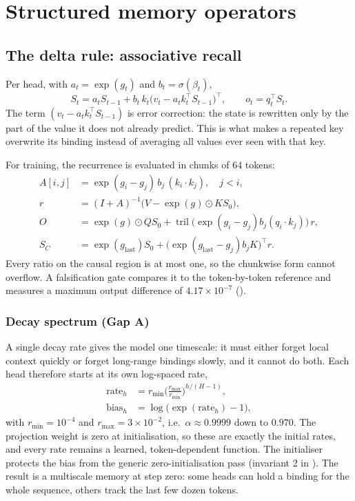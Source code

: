 \section{Structured memory operators}
\label{sec:memory}

\subsection{The delta rule: associative recall}
\label{sec:delta}

Per head, with $a_t=\exp(g_t)$ and $b_t=\sigma(\beta_t)$,
\begin{equation}
\label{eq:delta-seq}
S_t=a_t S_{t-1}+b_t\,k_t\big(v_t-a_t k_t^\top S_{t-1}\big)^\top,
\qquad o_t=q_t^\top S_t .
\end{equation}
The term $(v_t-a_t k_t^\top S_{t-1})$ is error correction: the state is rewritten only by the
part of the value it does not already predict. This is what makes a repeated key overwrite its
binding instead of averaging all values ever seen with that key.

For training, the recurrence is evaluated in chunks of 64 tokens:
\begin{align}
A[i,j]&=\exp(g_i-g_j)\,b_j\,(k_i\!\cdot\!k_j), \quad j<i,\\
r&=(I+A)^{-1}\big(V-\exp(g)\odot K S_0\big),\\
O&=\exp(g)\odot Q S_0+\operatorname{tril}\!\big(\exp(g_i-g_j)b_j(q_i\!\cdot\!k_j)\big)\,r,\\
S_C&=\exp(g_{\mathrm{last}})S_0+\big(\exp(g_{\mathrm{last}}-g_j)b_jK\big)^\top r .
\end{align}
Every ratio on the causal region is at most one, so the chunkwise form cannot overflow. A
falsification gate compares it to the token-by-token reference and measures a maximum output
difference of $4.17\times10^{-7}$ ().

\subsubsection{Decay spectrum (Gap A)}
\label{sec:gap-a-method}
A single decay rate gives the model one timescale: it must either forget local context quickly
or forget long-range bindings slowly, and it cannot do both. Each head therefore starts at its
own log-spaced rate,
\begin{equation}
\label{eq:spectrum}
\begin{aligned}
\mathrm{rate}_h&=r_{\min}\Big(\frac{r_{\max}}{r_{\min}}\Big)^{h/(H-1)},\\
\mathrm{bias}_h&=\log\!\big(\exp(\mathrm{rate}_h)-1\big),
\end{aligned}
\end{equation}
with $r_{\min}=10^{-4}$ and $r_{\max}=3\times10^{-2}$, i.e.\ $\alpha\approx0.9999$ down to
$0.970$. The projection weight is zero at initialisation, so these are exactly the initial
rates, and every rate remains a learned, token-dependent function. The initialiser protects the
bias from the generic zero-initialisation pass (invariant 2 in ). The result
is a multiscale memory at step zero: some heads can hold a binding for the whole sequence,
others track the last few dozen tokens.

